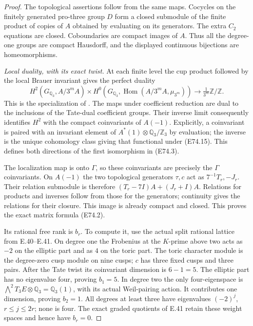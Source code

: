 \begin{proof}
The topological assertions follow from the same maps.
Cocycles on the finitely generated pro-three group $D$
form a closed submodule of the finite product of copies
of $A$ obtained by evaluating on its generators.
The extra $C_2$ equations are closed. Coboundaries are
compact images of $A$. Thus all the degree-one groups
are compact Hausdorff, and the displayed continuous
bijections are homeomorphisms.

\emph{Local duality, with its exact twist.}
At each finite level the cup product followed by the
local Brauer invariant gives the perfect duality
\[
 H^2(G_{\mathbb Q_3},A/3^mA)\times
 H^0(G_{\mathbb Q_3},\operatorname{Hom}(A/3^mA,\mu_{3^m}))
       \longrightarrow\tfrac1{3^m}\mathbb Z/\mathbb Z.
 \tag{E74.15}
\]
This is the specialization of
\cite[I, Theorem2.1 and Corollary2.3, pp.~26--28]{E_MilneADT}.
The maps under coefficient reduction are dual to
the inclusions of the Tate-dual coefficient groups.
Their inverse limit consequently identifies $H^2$ with
the compact coinvariants of $A(-1)$. Explicitly, a
coinvariant is paired with an invariant element of
$A^*(1)\otimes\mathbb Q_3/\mathbb Z_3$ by evaluation;
the inverse is the unique cohomology class giving that
functional under (E74.15). This defines both directions
of the first isomorphism in (E74.3).

The localization map is onto $\Gamma$, so these
coinvariants are precisely the $\Gamma$ coinvariants.
On $A(-1)$ the two topological generators $\tau,c$
act as $7^{-1}T_r,-J_r$. Their relation submodule is
therefore $(T_r-7I)A+(J_r+I)A$. Relations for products
and inverses follow from those for the generators;
continuity gives the relations for their closure.
This image is already compact and closed. This proves
the exact matrix formula (E74.2).

Its rational free rank is $b_r$. To compute it, use
the actual split rational lattice from E.40--E.41.
On degree one the Frobenius at the $K$-prime above two
acts as $-2$ on the elliptic part and as $4$ on the
toric part. The toric character module is the
degree-zero cusp module on nine cusps; $c$ has three
fixed cusps and three pairs. After the Tate twist its
coinvariant dimension is $6-1=5$. The elliptic part
has no eigenvalue four, proving $b_1=5$. In degree two
the only four-eigenspace is
$\bigwedge^2T_3E\otimes\mathbb Q_3=\mathbb Q_3(1)$,
with its actual Weil-pairing action. It contributes
one dimension, proving $b_2=1$. All degrees at least
three have eigenvalues $(-2)^j$, $r\le j\le2r$;
none is four. The exact graded quotients of E.41
retain these weight spaces and hence have $b_r=0$.


\end{proof}

